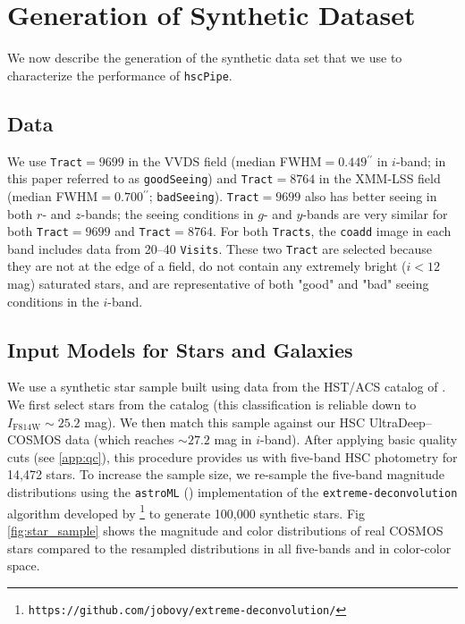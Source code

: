 \documentclass[useamsfonts]{pasj01}
\def\asec{$^{\prime\prime}$}
\def\hscpipe{\texttt{hscPipe}}
\def\coadd{\texttt{coadd}}
\def\tract{\texttt{Tract}}
\def\tracts{\texttt{Tracts}}
\def\visits{\texttt{Visits}}
\begin{document}
\section{Generation of Synthetic Dataset}
    \label{sec:test}
    
    We now describe the generation of the synthetic data set that we use to 
    characterize the performance of \hscpipe{}.

\subsection{Data}
    We use \tract{}$=9699$ in the VVDS field (median FWHM$=0.449$\asec{} in $i$-band;
    in this paper referred to as \texttt{goodSeeing}) and
    \tract{}$=8764$ in the XMM-LSS field (median FWHM$=0.700$\asec{};
    \texttt{badSeeing}).
    \tract{}$=9699$ also has better seeing in both $r$- and $z$-bands;
    the seeing conditions in $g$- and $y$-bands are very similar for both
    \tract{}$=9699$ and \tract{}$=8764$.
    For both \tracts{}, the \coadd{} image in each band includes data from
    20--40 \visits{}.  
    These two \tract{} are selected because they are not at the edge of a field, do 
    not contain any extremely bright ($i<12$ mag) saturated stars, and are 
    representative of both "good" and "bad" seeing conditions in the $i$-band.

\subsection{Input Models for Stars and Galaxies}
    \label{ssec:inputs}

    We use a synthetic star sample built using data from the HST/ACS catalog of 
    \citet{Leauthaud2007}.  
    We first select stars from the \citet{Leauthaud2007} catalog (this classification 
    is reliable down to $I_{\mathrm{F814W}}{\sim}25.2$ mag). 
    We then match this sample against our HSC UltraDeep--COSMOS data (which reaches 
    ${\sim}27.2$ mag in $i$-band). 
    After applying basic quality cuts (see \ref{app:qc}), this procedure provides us 
    with five-band HSC photometry for 14,472 stars.
    To increase the sample size, we re-sample the five-band magnitude distributions 
    using the \texttt{astroML} (\citealt{astroml}) implementation of the 
    \texttt{extreme-deconvolution} algorithm developed by \citet{Bovy2011}
    \footnote{\texttt{https://github.com/jobovy/extreme-deconvolution/}} to
    generate 100,000 synthetic stars. 
    Fig \ref{fig:star_sample} shows the magnitude and color distributions of real 
    COSMOS stars compared to the resampled distributions in all five-bands and in 
    color-color space.
\end{document}
